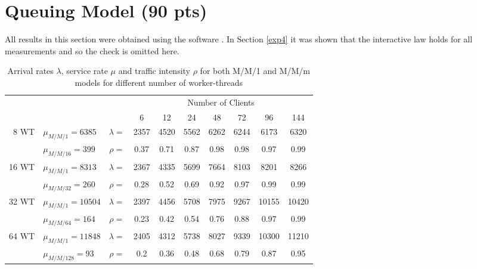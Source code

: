 \documentclass[report.tex]{subfiles}
\begin{document}
\section{Queuing Model (90 pts)}

All results in this section were obtained using the software \cite{queueing}.
In Section \ref{exp4} it was shown that the interactive law holds for all measurements and so the check is omitted here.


\begin{table}
	\centering
	\begin{tabular}{r|lcccccccc|}
		\multicolumn{3}{c}{}  & \multicolumn{7}{c}{Number of Clients}\Tstrut \\ 
		\multicolumn{3}{c}{}   & 6 & 12 & 24 & 48 & 72 & 96 & \multicolumn{1}{c}{144} \\ 
		\cline{2-10}
		\multirow{2}{*}{8 WT } & $\mu_{M/M/1} = 6385$ & $\lambda = $ & 2357 & 4520 & 5562 & 6262 & 6244 & 6173 & 6320\Tstrut \\
		& $\mu_{M/M/16} = 399$ & $\rho =$ & 0.37 & 0.71 & 0.87 & 0.98 & 0.98 & 0.97 & 0.99 \\
		\cline{2-10}
		\multirow{2}{*}{16 WT } & $\mu_{M/M/1} = 8313$ & $\lambda = $ & 2367 & 4335 & 5699 & 7664 & 8103 & 8201 & 8266\Tstrut \\
		& $\mu_{M/M/32} = 260$ & $\rho =$ & 0.28 & 0.52 & 0.69 & 0.92 & 0.97 & 0.99 & 0.99 \\
		\cline{2-10}
		\multirow{2}{*}{32 WT } & $\mu_{M/M/1} = 10504$ & $\lambda = $ & 2397 & 4456 & 5708 & 7975 & 9267 & 10155 & 10420\Tstrut \\
		& $\mu_{M/M/64} = 164$ & $\rho =$ & 0.23 & 0.42 & 0.54 & 0.76 & 0.88 & 0.97 & 0.99 \\
		\cline{2-10}
		\multirow{2}{*}{64 WT } & $\mu_{M/M/1} = 11848$ & $\lambda = $ & 2405 & 4312 & 5738 & 8027 & 9339 & 10300 & 11210\Tstrut \\
		& $\mu_{M/M/128} = 93$ & $\rho =$ & 0.2 & 0.36 & 0.48 & 0.68 & 0.79 & 0.87 & 0.95 \\
		\cline{2-10}
	\end{tabular}
	\caption{Arrival rates $\lambda$, service rate $\mu$ and traffic intensity $\rho$ for both M/M/1 and M/M/m models for different number of worker-threads} \label{exp70_arrival_service_traffic} 
\end{table}
\end{document}

